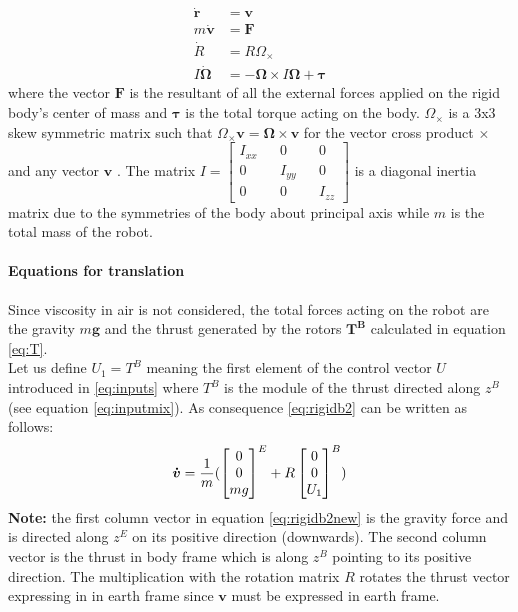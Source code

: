 \begin{align}
\label{eq:rigidb1}
\boldsymbol{\dot{r}}& = \boldsymbol{v}\\ \label{eq:rigidb2}
m\boldsymbol{\dot{v}}& = \boldsymbol{F}\\ 
\label{eq:rigidb3}
\dot{R}& = R\Omega_\times\\ 
\label{eq:rigidb4}
I\boldsymbol{\dot{\Omega}}& = -\boldsymbol{\Omega} \times I\boldsymbol{\Omega} + \boldsymbol{\tau}
\end{align}
\noindent
where the vector $\boldsymbol{F}$ is the resultant of all the external forces applied on the rigid body's center of mass and $\boldsymbol{\tau}$ is the total torque acting on the body. $\Omega_\times$ is a 3x3 skew symmetric matrix such that $\Omega_\times \boldsymbol{v} = \boldsymbol{\Omega} \times \boldsymbol{v}$ for the vector cross product $\times$ and any vector $\boldsymbol{v}$ \cite{Mahony2012}. The matrix $I=\begin{bmatrix}
I_{xx}&&0&&0\\0&&I_{yy}&&0\\0&&0&&I_{zz}
\end{bmatrix}$ is a diagonal inertia matrix due to the symmetries of the body about principal axis while $m$ is the total mass of the robot.

\paragraph{Equations for translation}

Since viscosity in air is not considered, the total forces acting on the robot are the gravity $m\boldsymbol{g}$ and the thrust generated by the rotors $\boldsymbol{T^B}$ calculated in equation \ref{eq:T}. \\

\noindent
Let us define $U_1 = T^B$ meaning the first element of the control vector $U$ introduced in \ref{eq:inputs} where $T^B$ is the module of the thrust directed along $z^B$ (see equation \ref{eq:inputmix}).
As consequence \eqref{eq:rigidb2} can be written as follows:
\vspace{1ex}
\begin{equation}
\vspace{1ex}
\boldsymbol{\dot{v}} = \frac{1}{m}(\begin{bmatrix}0\\0\\mg\end{bmatrix}^E + R\begin{bmatrix}0\\0\\U_1\end{bmatrix}^B)
\label{eq:rigidb2new}
\end{equation}
\textbf{Note:} the first column vector in equation \ref{eq:rigidb2new} is the gravity force and is directed along $z^E$ on its positive direction (downwards). The second column vector is the thrust in body frame which is along $z^B$ pointing to its positive direction. The multiplication with the rotation matrix $R$ rotates the thrust vector expressing in in earth frame since $\boldsymbol{v}$ must be expressed in earth frame.\\

